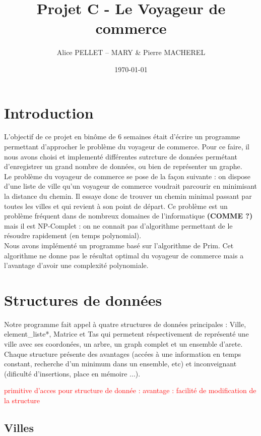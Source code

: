 \documentclass[a4paper,11pt]{article}
\date{\today}
\title{Projet C - Le Voyageur de commerce}
\author{Alice PELLET -- MARY \& Pierre MACHEREL}
\begin{document}
\maketitle
\tableofcontents

\section*{Introduction} %

L'objectif de ce projet en binôme de 6 semaines était d'écrire un programme permettant d'approcher le problème du voyageur de commerce. Pour ce faire, il nous avons choisi et implementé différentes sutrcture de données permétant d'enregistrer un grand nombre de données, ou bien de représenter un graphe.\\
Le problème du voyageur de commerce se pose de la façon suivante : on dispose d'une liste de ville qu'un voyageur de commerce voudrait parcourir en minimisant la distance du chemin. Il essaye donc de trouver un chemin minimal passant par toutes les villes et qui revient à son point de départ. Ce problème est un problème fréquent dans de nombreux domaines de l'informatique \textbf{{\Large (COMME ?)}} mais il est NP-Complet : on ne connait pas d'algorithme permettant de le résoudre rapidement (en temps polynomial).\\
Nous avons implémenté un programme basé sur l’algorithme de Prim. Cet algorithme ne donne pas le résultat optimal du voyageur de commerce mais a l'avantage d'avoir une complexité polynomiale.\\

\section{Structures de données}
Notre programme fait appel à quatre structures de données principales : \textsf{Ville}, \textsf{element\_liste*}, \textsf{Matrice} et \textsf{Tas} qui permetent réspectivement de représenté une ville avec ses coordonées, un arbre, un graph complet et un ensemble d'arete.
Chaque structure présente des avantages (accées à une information en temps constant, recherche d'un minimum dans un ensemble, etc) et inconveignant (dificulté d'insertions, place en mémoire ...).

\textcolor{red}{primitive d'acces pour structure de donnée : avantage : facilité de modification de la structure}

\subsection{Villes}
\end{document}
